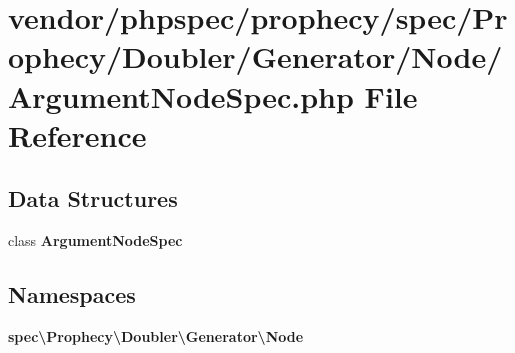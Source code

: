 \section{vendor/phpspec/prophecy/spec/\+Prophecy/\+Doubler/\+Generator/\+Node/\+Argument\+Node\+Spec.php File Reference}
\label{_argument_node_spec_8php}
\subsection*{Data Structures}
\begin{DoxyCompactItemize}
\item 
class {\bf Argument\+Node\+Spec}
\end{DoxyCompactItemize}
\subsection*{Namespaces}
\begin{DoxyCompactItemize}
\item 
 {\bf spec\textbackslash{}\+Prophecy\textbackslash{}\+Doubler\textbackslash{}\+Generator\textbackslash{}\+Node}
\end{DoxyCompactItemize}
